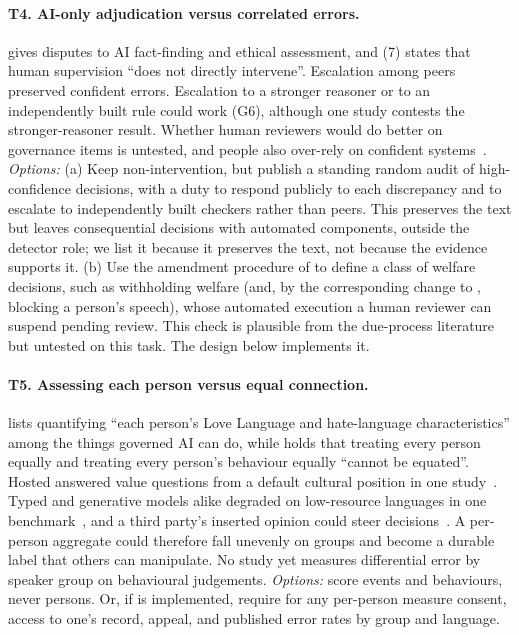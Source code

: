 \paragraph{T4. AI-only adjudication versus correlated errors.}
 gives disputes to AI fact-finding and ethical assessment, and (7) states that human supervision ``does not directly intervene''.
Escalation among peers preserved confident errors.
Escalation to a stronger reasoner or to an independently built rule could work (G6), although one study contests the stronger-reasoner result.
Whether human reviewers would do better on governance items is untested, and people also over-rely on confident systems~\cite{parasuraman2010complacency,green2022flaws,green2019principles}.
\emph{Options:} (a) Keep non-intervention, but publish a standing random audit of high-confidence decisions, with a duty to respond publicly to each discrepancy and to escalate to independently built checkers rather than peers.
This preserves the text but leaves consequential decisions with automated components, outside the detector role; we list it because it preserves the text, not because the evidence supports it.
(b) Use the amendment procedure of  to define a class of welfare decisions, such as withholding welfare (and, by the corresponding change to , blocking a person's speech), whose automated execution a human reviewer can suspend pending review.
This check is plausible from the due-process literature~\cite{citron2008technological} but untested on this task. The design below implements it.

\paragraph{T5. Assessing each person versus equal connection.}
 lists quantifying ``each person's Love Language and hate-language characteristics'' among the things governed AI can do, while  holds that treating every person equally and treating every person's behaviour equally ``cannot be equated''.
Hosted \jev{} answered value questions from a default cultural position in one study~\cite{arx36399}.
Typed and generative models alike degraded on low-resource languages in one benchmark~\cite{arx37647}, and a third party's inserted opinion could steer decisions~\cite{arx31142}.
A per-person aggregate could therefore fall unevenly on groups and become a durable label that others can manipulate.
No study yet measures differential error by speaker group on behavioural judgements.
\emph{Options:} score events and behaviours, never persons.
Or, if  is implemented, require for any per-person measure consent, access to one's record, appeal, and published error rates by group and language.

